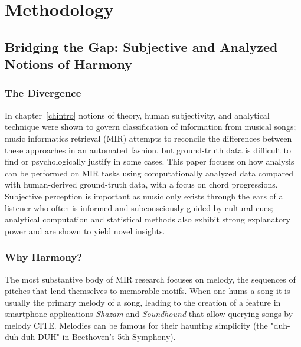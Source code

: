 \chapter{Methodology} \label{computationchordextract}

\section{Bridging the Gap: Subjective and Analyzed Notions of Harmony}

\subsection{The Divergence}

In chapter~\ref{chintro} notions of theory, human subjectivity, and analytical technique were shown to govern classification of information from musical songs; music informatics retrieval (MIR) attempts to reconcile the differences between these approaches in an automated fashion, but ground-truth data is difficult to find or psychologically justify in some cases. This paper focuses on how analysis can be performed on MIR tasks using computationally analyzed data compared with human-derived ground-truth data, with a focus on chord progressions. Subjective perception is important as music only exists through the ears of a listener who often is informed and subconsciously guided by cultural cues; analytical computation and statistical methods also exhibit strong explanatory power and are shown to yield novel insights. 


\subsection{Why Harmony?}

The most substantive body of MIR research focuses on melody, the sequences of pitches that lend themselves to memorable motifs. When one hums a song it is usually the primary melody of a song, leading to the creation of a feature in smartphone applications \textit{Shazam} and \textit{Soundhound} that allow querying songs by melody CITE. Melodies can be famous for their haunting simplicity (the "duh-duh-duh-DUH" in Beethoven's 5th Symphony).

